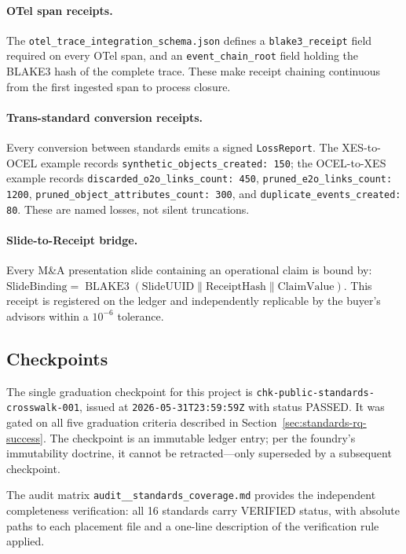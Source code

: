 \paragraph{OTel span receipts.}
The \texttt{otel\_trace\_integration\_schema.json} defines a \texttt{blake3\_receipt}
field required on every OTel span, and an \texttt{event\_chain\_root} field holding the
BLAKE3 hash of the complete trace. These make receipt chaining continuous from the first
ingested span to process closure.

\paragraph{Trans-standard conversion receipts.}
Every conversion between standards emits a signed \texttt{LossReport}. The XES-to-OCEL
example records \texttt{synthetic\_objects\_created: 150}; the OCEL-to-XES example records
\texttt{discarded\_o2o\_links\_count: 450}, \texttt{pruned\_e2o\_links\_count: 1200},
\texttt{pruned\_object\_attributes\_count: 300}, and \texttt{duplicate\_events\_created: 80}.
These are named losses, not silent truncations.

\paragraph{Slide-to-Receipt bridge.}
Every M\&A presentation slide containing an operational claim is bound by:
$\text{SlideBinding} = \operatorname{BLAKE3}(\text{SlideUUID} \parallel \text{ReceiptHash}
\parallel \text{ClaimValue})$. This receipt is registered on the ledger and independently
replicable by the buyer's advisors within a $10^{-6}$ tolerance.

\subsection{Checkpoints}
\label{sec:standards-evidence-checkpoints}

The single graduation checkpoint for this project is
\texttt{chk-public-standards-crosswalk-001}, issued at \texttt{2026-05-31T23:59:59Z} with
status PASSED. It was gated on all five graduation criteria described in
Section~\ref{sec:standards-rq-success}. The checkpoint is an immutable ledger entry;
per the foundry's immutability doctrine, it cannot be retracted---only superseded by a
subsequent checkpoint.

The audit matrix \texttt{audit\_\_standards\_coverage.md} provides the independent
completeness verification: all 16 standards carry VERIFIED status, with absolute paths to
each placement file and a one-line description of the verification rule applied.

